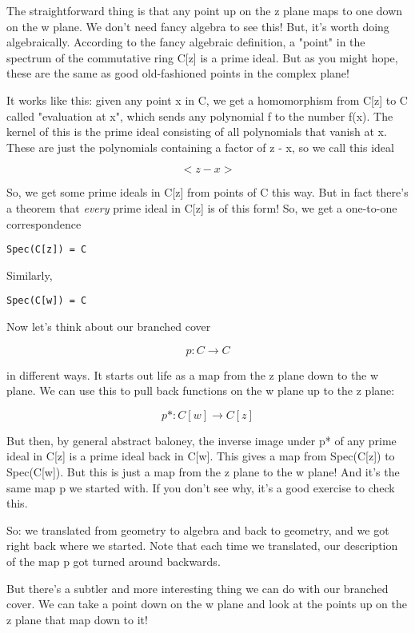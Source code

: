 The straightforward thing is that any point up on the z plane maps to one 
down on the w plane.  We don't need fancy algebra to see this!  But, it's
worth doing algebraically.  According to the fancy algebraic definition,
a "point" in the spectrum of the commutative ring C[z] is a prime 
ideal.  But as you might hope, these are the same as good old-fashioned points 
in the complex plane! 

It works like this: given any point x in C, we get a homomorphism from 
C[z] to C called "evaluation at x", which sends any polynomial f to 
the number f(x).  The kernel of this is the prime ideal consisting of 
all polynomials that vanish at x.  These are just the polynomials 
containing a factor of z - x, so we call this ideal 

$$
<z - x> 
$$
    

So, we get some prime ideals in C[z] from points of C this way.  But in 
fact there's a theorem that \emph{every} 
prime ideal in C[z] is of this form!  
So, we get a one-to-one correspondence

\begin{verbatim}
Spec(C[z]) = C
\end{verbatim}
    
Similarly, 

\begin{verbatim}
Spec(C[w]) = C
\end{verbatim}
    

Now let's think about our branched cover 

$$
p: C \to  C
$$
    

in different ways.  It starts out life as a map from the z plane down 
to the w plane.   We can use this to pull back functions on the w 
plane up to the z plane:

$$
p*: C[w] \to  C[z]
$$
    

But then, by general abstract baloney, the inverse image under p* of 
any prime ideal in C[z] is a prime ideal back in C[w].  This gives a 
map from Spec(C[z]) to Spec(C[w]).  But this is just a map from the z 
plane to the w plane!  And it's the same map p we started with.  If you
don't see why, it's a good exercise to check this.

So: we translated from geometry to algebra and back to geometry, and 
we got right back where we started.   Note that each time we translated,
our description of the map p got turned around backwards.

But there's a subtler and more interesting thing we can do with our
branched cover.  We can take a point down on the w plane and look at 
the points up on the z plane that map down to it!  

